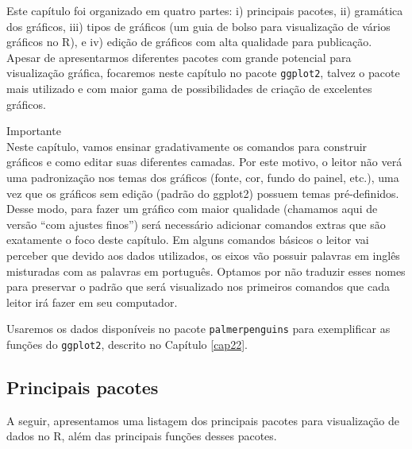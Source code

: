 \documentclass[
]{article}
\begin{document}
Este capítulo foi organizado em quatro partes: i) principais pacotes, ii) gramática dos gráficos, iii) tipos de gráficos (um guia de bolso para visualização de vários gráficos no R), e iv) edição de gráficos com alta qualidade para publicação. Apesar de apresentarmos diferentes pacotes com grande potencial para visualização gráfica, focaremos neste capítulo no pacote \texttt{ggplot2}, talvez o pacote mais utilizado e com maior gama de possibilidades de criação de excelentes gráficos.

Importante \\
Neste capítulo, vamos ensinar gradativamente os comandos para construir gráficos e como editar suas diferentes camadas. Por este motivo, o leitor não verá uma padronização nos temas dos gráficos (fonte, cor, fundo do painel, etc.), uma vez que os gráficos sem edição (padrão do ggplot2) possuem temas pré-definidos. Desse modo, para fazer um gráfico com maior qualidade (chamamos aqui de versão ``com ajustes finos'') será necessário adicionar comandos extras que são exatamente o foco deste capítulo. Em alguns comandos básicos o leitor vai perceber que devido aos dados utilizados, os eixos vão possuir palavras em inglês misturadas com as palavras em português. Optamos por não traduzir esses nomes para preservar o padrão que será visualizado nos primeiros comandos que cada leitor irá fazer em seu computador.

Usaremos os dados disponíveis no pacote \texttt{palmerpenguins} para exemplificar as funções do \texttt{ggplot2}, descrito no Capítulo \ref{cap22}.

\hypertarget{principais-pacotes}{%
\subsection{Principais pacotes}\label{principais-pacotes}}

A seguir, apresentamos uma listagem dos principais pacotes para visualização de dados no R, além das principais funções desses pacotes.
\end{document}
